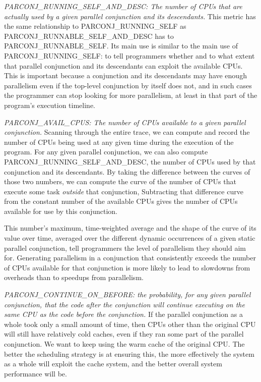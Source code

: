 \emph{PARCONJ\_RUNNING\_SELF\_AND\_DESC:
The number of CPUs that are actually used by a given parallel conjunction
and its descendants.}
This metric has the same relationship to PARCONJ\_RUNNING\_SELF
as PARCONJ\_RUNNABLE\_SELF\_AND\_DESC has to PARCONJ\_RUNNABLE\_SELF.
Its main use is similar to the main use of PARCONJ\_RUNNING\_SELF:
to tell programmers whether and to what extent
that parallel conjunction and its descendants can exploit the available CPUs.
This is important because a conjunction and its descendants
may have enough parallelism
even if the top-level conjunction by itself does not,
and in such cases the programmer can stop looking for more parallelism,
at least in that part of the program's execution timeline.

\emph{PARCONJ\_AVAIL\_CPUS:
The number of CPUs available to a given parallel conjunction.}
Scanning through the entire trace,
we can compute and record the number of CPUs being used
at any given time during the execution of the program.
For any given parallel conjunction,
we can also compute PARCONJ\_RUNNING\_SELF\_AND\_DESC,
the number of CPUs used by that conjunction and its descendants.
By taking the difference between the curves of those two numbers,
we can compute the curve of the number of CPUs
that execute some task \emph{outside} that conjunction,
Subtracting that difference curve
from the constant number of the available CPUs
gives the number of CPUs available for use by this conjunction.

This number's maximum, time-weighted average
and the shape of the curve of its value over time,
averaged over the different dynamic occurrences
of a given static parallel conjunction,
tell programmers the level of parallelism they should aim for.
Generating parallelism in a conjunction
that consistently exceeds the number of CPUs available for that conjunction
is more likely to lead to slowdowns from overheads
than to speedups from parallelism.

\emph{PARCONJ\_CONTINUE\_ON\_BEFORE:
the probability, for any given parallel conjunction,
that the code after the conjunction
will continue executing on the same CPU
as the code before the conjunction.}
If the parallel conjunction as a whole took only a small amount of time,
then CPUs other than the original CPU will still have relatively cold caches,
even if they ran some part of the parallel conjunction.
We want to keep using the warm cache of the original CPU.
The better the scheduling strategy is at ensuring this,
the more effectively the system as a whole will exploit the cache system,
and the better overall system performance will be.

